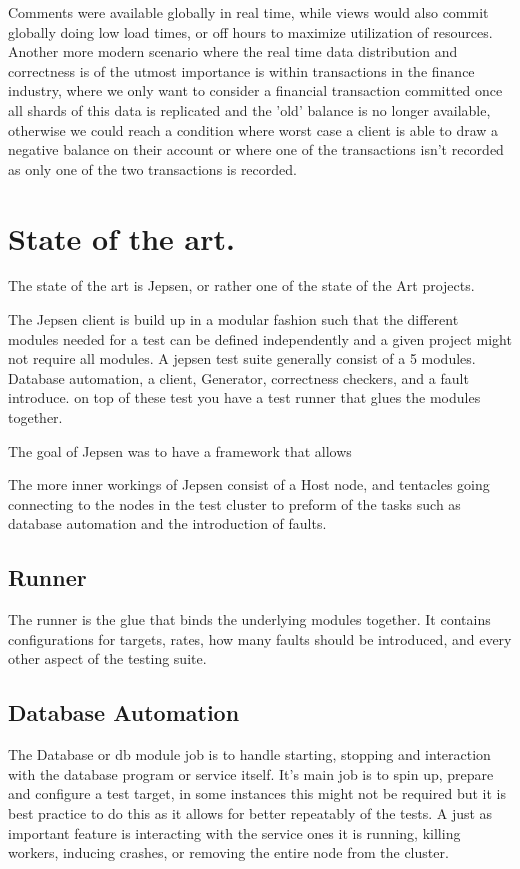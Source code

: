 \documentclass[a4paper,10pt,titlepage]{report}
\begin{document}
Comments were available globally in real time, while views would also commit globally doing low load times, or off hours to maximize utilization of resources.\\
\vspace{5mm}
Another more modern scenario where the real time data distribution and correctness is of the utmost importance is within transactions in the finance industry,  where we only want to consider a financial transaction committed once all shards of this data is replicated and the 'old' balance is no longer available, otherwise we could reach a condition where worst case a client is able to draw a negative balance on their account or where one of the transactions isn't recorded as only one of the two transactions is recorded.\\


\section{State of the art.}

The state of the art is Jepsen, or rather one of the state of the Art projects.

The Jepsen client is build up in a modular fashion such that the different modules needed for a test can be defined independently and a given project might not require all modules. A jepsen test suite generally consist of a 5 modules. Database automation, a client, Generator, correctness checkers, and a fault introduce. on top of these test you have a test runner that glues the modules together.

The goal of Jepsen was to have a framework that allows 

The more inner workings of Jepsen consist of a Host node, and tentacles going connecting to the nodes in the test cluster to preform of the tasks such as database automation and the introduction of faults.

\subsection{Runner}

The runner is the glue that binds the underlying modules together. It contains configurations for targets, rates, how many faults should be introduced, and every other aspect of the testing suite.

\subsection{Database Automation}
 The Database or db module job is to handle starting, stopping and interaction with the database program or service itself. It's main job is to spin up, prepare and configure a test target, in some instances this might not be required but it is best practice to do this as it allows for better repeatably of the tests. A just as important feature is interacting with the service ones it is running, killing workers, inducing crashes, or removing the entire node from the cluster.
\end{document}
